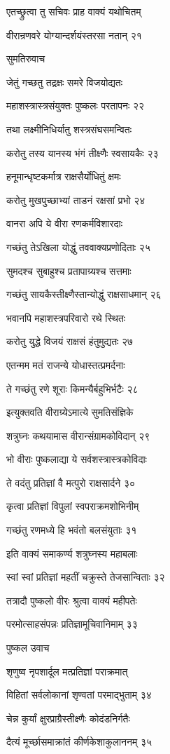 एतच्छ्रुत्वा तु सचिवः प्राह वाक्यं यथोचितम्

वीरान्रणवरे योग्यान्दर्शयंस्तरसा नतान् २१

सुमतिरुवाच

जेतुं गच्छतु तद्रक्षः समरे विजयोद्यतः

महाशस्त्रास्त्रसंयुक्तः पुष्कलः परतापनः २२

तथा लक्ष्मीनिधिर्यातु शस्त्रसंघसमन्वितः

करोतु तस्य यानस्य भंगं तीक्ष्णैः स्वसायकैः २३

हनूमान्धृष्टकर्मात्र राक्षसैर्योधितुं क्षमः

करोतु मुखपुच्छाभ्यां ताडनं रक्षसां प्रभो २४

वानरा अपि ये वीरा रणकर्मविशारदाः

गच्छंतु तेऽखिला योद्धुं तववाक्यप्रणोदिताः २५

सुमदश्च सुबाहुश्च प्रतापाग्र्यश्च सत्तमाः

गच्छंतु सायकैस्तीक्ष्णैस्तान्योद्धुं राक्षसाधमान् २६

भवानपि महाशस्त्रपरिवारो रथे स्थितः

करोतु युद्धे विजयं राक्षसं हंतुमुद्यतः २७

एतन्मम मतं राजन्ये योधास्तत्प्रमर्दनाः

ते गच्छंतु रणे शूराः किमन्यैर्बहुभिर्भटैः २८

इत्युक्तवति वीराग्र्येऽमात्ये सुमतिसंज्ञिके

शत्रुघ्नः कथयामास वीरान्संग्रामकोविदान् २९

भो वीराः पुष्कलाद्या ये सर्वशस्त्रास्त्रकोविदाः

ते वदंतु प्रतिज्ञां वै मत्पुरो राक्षसार्दने ३०

कृत्वा प्रतिज्ञां विपुलां स्वपराक्रमशोभिनीम्

गच्छंतु रणमध्ये हि भवंतो बलसंयुताः ३१

इति वाक्यं समाकर्ण्य शत्रुघ्नस्य महाबलाः

स्वां स्वां प्रतिज्ञां महतीं चक्रुस्ते तेजसान्विताः ३२

तत्रादौ पुष्कलो वीरः श्रुत्वा वाक्यं महीपतेः

परमोत्साहसंपन्नः प्रतिज्ञामूचिवानिमाम् ३३

पुष्कल उवाच

शृणुष्व नृपशार्दूल मत्प्रतिज्ञां पराक्रमात्

विहितां सर्वलोकानां शृण्वतां परमाद्भुताम् ३४

चेन्न कुर्यां क्षुरप्राग्रैस्तीक्ष्णैः कोदंडनिर्गतैः

दैत्यं मूर्च्छासमाक्रांतं कीर्णकेशाकुलाननम् ३५

